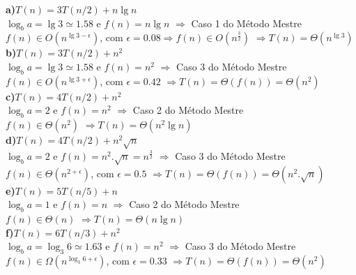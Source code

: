 \documentclass[a4paper]{exam}
\begin{document}
\begin{questions}
  \begin{solution}
    \textbf{a)$T(n) = 3T(n/2) + n\lg n$}\\
      $\log_b a = \lg 3 \simeq 1.58$ e $f(n) = n\lg n$ $\Rightarrow$  Caso 1 do Método Mestre\\
      $f(n) \in O(n^{\lg 3 - \epsilon})$, com $\epsilon = 0.08 \Rightarrow f(n) \in O(n^{\frac{3}{2}})$
      $\Rightarrow T(n) = \Theta(n^{\lg 3})$\\

    \textbf{b)$T(n) = 3T(n/2) + n^2$}\\
      $\log_b a = \lg 3 \simeq 1.58$ e $f(n) = n^2$ $\Rightarrow$  Caso 3 do Método Mestre\\
      $f(n) \in O(n^{\lg 3 + \epsilon})$, com $\epsilon = 0.42$
      $\Rightarrow T(n) = \Theta(f(n)) = \Theta(n^2)$\\

    \textbf{c)$T(n) = 4T(n/2) + n^2$}\\
      $\log_b a = 2 $ e $f(n) = n^2$ $\Rightarrow$  Caso 2 do Método Mestre\\
      $f(n) \in \Theta(n^2)$
      $\Rightarrow T(n) = \Theta(n^2 \lg n)$\\

    \textbf{d)$T(n) = 4T(n/2) + n^2\sqrt{n}$}\\
      $\log_b a = 2 $ e $f(n) = n^2.\sqrt{n} = n^{\frac{3}{2}}$ $\Rightarrow$  Caso 3 do Método Mestre\\
      $f(n) \in \Theta(n^{2 + \epsilon})$, com $\epsilon = 0.5$
      $\Rightarrow T(n) = \Theta(f(n)) = \Theta(n^2.\sqrt{n})$\\

    \textbf{e)$T(n) = 5T(n/5) + n$}\\
      $\log_b a = 1 $ e $f(n) = n$ $\Rightarrow$  Caso 2 do Método Mestre\\
      $f(n) \in \Theta(n)$
      $\Rightarrow T(n) = \Theta(n\lg n)$\\

    \textbf{f)$T(n) = 6T(n/3) + n^2$}\\
      $\log_b a = \log_3 6 \simeq 1.63$ e $f(n) = n^2$ $\Rightarrow$  Caso 3 do Método Mestre\\
      $f(n) \in \Omega(n^{\log_3 6 + \epsilon})$, com $\epsilon = 0.33$
      $\Rightarrow T(n) = \Theta(f(n)) = \Theta(n^2)$\\
      

\end{solution}
\end{questions}
\end{document}
